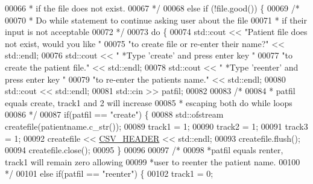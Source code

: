 \begin{DoxyCode}
00066 \textcolor{comment}{             * if the file does not exist.}
00067 \textcolor{comment}{             */}
00068             \textcolor{keywordflow}{else} \textcolor{keywordflow}{if} (!file.good()) \{
00069                 \textcolor{comment}{/* }
00070 \textcolor{comment}{                 * Do while statement to continue asking user about the file}
00071 \textcolor{comment}{                 * if their input is not acceptable}
00072 \textcolor{comment}{                 */} 
00073                 \textcolor{keywordflow}{do} \{
00074                     std::cout << \textcolor{stringliteral}{"Patient file does not exist, would you like "}
00075                         \textcolor{stringliteral}{"to create file or re-enter their name?"} << std::endl;
00076                     std::cout << \textcolor{stringliteral}{"  *Type 'create' and press enter key "}
00077                         \textcolor{stringliteral}{"to create the patient file."} << std::endl;
00078                     std::cout << \textcolor{stringliteral}{"  *Type 'reenter' and press enter key "}
00079                         \textcolor{stringliteral}{"to re-enter the patients name."} << std::endl;
00080                     std::cout << std::endl;
00081                     std::cin >> patfil;
00082 
00083                     \textcolor{comment}{/* }
00084 \textcolor{comment}{                     * patfil equals create, track1 and 2 will increase}
00085 \textcolor{comment}{                     * escaping both do while loops}
00086 \textcolor{comment}{                     */}
00087                     \textcolor{keywordflow}{if}(patfil == \textcolor{stringliteral}{"create"}) \{
00088                         std::ofstream createfile(patientname.c\_str());
00089                         track1 = 1;
00090                         track2 = 1;
00091                         track3 = 1;
00092                         createfile << \hyperlink{definitions_8hpp_ac686b5c4edb9968dade15aad6e58bdca}{CSV\_HEADER} << std::endl;
00093                         createfile.flush();
00094                         createfile.close();
00095                     \}
00096 
00097                     \textcolor{comment}{/*}
00098 \textcolor{comment}{                     *patfil equals renter, track1 will remain zero allowing}
00099 \textcolor{comment}{                     *user to reenter the patient name.}
00100 \textcolor{comment}{                     */}
00101                     \textcolor{keywordflow}{else} \textcolor{keywordflow}{if}(patfil == \textcolor{stringliteral}{"reenter"}) \{
00102                         track1 = 0;

\end{DoxyCode}

